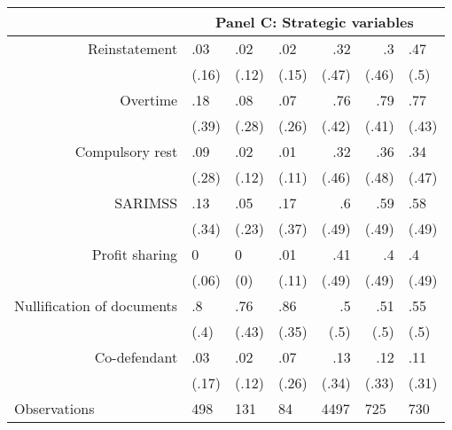 \begin{tabular}{rrrrrrr}
      \midrule
      & \multicolumn{6}{c}{Panel C: Strategic variables} \\
      \midrule
      \midrule
Reinstatement & \multicolumn{1}{l}{.03} & \multicolumn{1}{l}{.02} & \multicolumn{1}{l}{.02} & .32   & .3    & \multicolumn{1}{l}{.47} \\
      & \multicolumn{1}{l}{(.16)} & \multicolumn{1}{l}{(.12)} & \multicolumn{1}{l}{(.15)} & (.47) & (.46) & \multicolumn{1}{l}{(.5)} \\
Overtime & \multicolumn{1}{l}{.18} & \multicolumn{1}{l}{.08} & \multicolumn{1}{l}{.07} & .76   & .79   & \multicolumn{1}{l}{.77} \\
      & \multicolumn{1}{l}{(.39)} & \multicolumn{1}{l}{(.28)} & \multicolumn{1}{l}{(.26)} & (.42) & (.41) & \multicolumn{1}{l}{(.43)} \\
Compulsory rest & \multicolumn{1}{l}{.09} & \multicolumn{1}{l}{.02} & \multicolumn{1}{l}{.01} & .32   & .36   & \multicolumn{1}{l}{.34} \\
      & \multicolumn{1}{l}{(.28)} & \multicolumn{1}{l}{(.12)} & \multicolumn{1}{l}{(.11)} & (.46) & (.48) & \multicolumn{1}{l}{(.47)} \\
SARIMSS & \multicolumn{1}{l}{.13} & \multicolumn{1}{l}{.05} & \multicolumn{1}{l}{.17} & .6    & .59   & \multicolumn{1}{l}{.58} \\
      & \multicolumn{1}{l}{(.34)} & \multicolumn{1}{l}{(.23)} & \multicolumn{1}{l}{(.37)} & (.49) & (.49) & \multicolumn{1}{l}{(.49)} \\
Profit sharing & \multicolumn{1}{l}{0} & \multicolumn{1}{l}{0} & \multicolumn{1}{l}{.01} & .41   & .4    & \multicolumn{1}{l}{.4} \\
      & \multicolumn{1}{l}{(.06)} & \multicolumn{1}{l}{(0)} & \multicolumn{1}{l}{(.11)} & (.49) & (.49) & \multicolumn{1}{l}{(.49)} \\
Nullification of documents & \multicolumn{1}{l}{.8} & \multicolumn{1}{l}{.76} & \multicolumn{1}{l}{.86} & .5    & .51   & \multicolumn{1}{l}{.55} \\
      & \multicolumn{1}{l}{(.4)} & \multicolumn{1}{l}{(.43)} & \multicolumn{1}{l}{(.35)} & (.5)  & (.5)  & \multicolumn{1}{l}{(.5)} \\
Co-defendant & \multicolumn{1}{l}{.03} & \multicolumn{1}{l}{.02} & \multicolumn{1}{l}{.07} & .13   & .12   & \multicolumn{1}{l}{.11} \\
      & \multicolumn{1}{l}{(.17)} & \multicolumn{1}{l}{(.12)} & \multicolumn{1}{l}{(.26)} & (.34) & (.33) & \multicolumn{1}{l}{(.31)} \\
      \bottomrule
\multicolumn{1}{l}{Observations} & \multicolumn{1}{l}{498} & \multicolumn{1}{l}{131} & \multicolumn{1}{l}{84} & \multicolumn{1}{l}{4497} & \multicolumn{1}{l}{725} & \multicolumn{1}{l}{730} \\
\bottomrule
\bottomrule
\end{tabular}%

